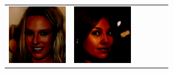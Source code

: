 \documentclass{article}
\newcommand{\pganw}{1.0in}
\begin{document}
\begin{table}[htbp]
\begin{center}
\begin{tabular}{cc|cc|cc}
\includegraphics[width=\pganw]{figures/pgan/12_base_raw_base.png} &
\includegraphics[width=\pganw]{figures/pgan/13_base_raw_base.png} &

\end{tabular}
\end{center}
\end{table}
\end{document}
